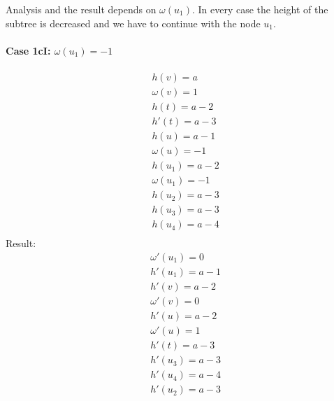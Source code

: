 Analysis and the result depends on $\omega(u_1)$. In every case the height of the subtree is decreased and we have to continue with the node $u_1$.
\paragraph*{\textbf{Case 1cI}: $\omega(u_1) = -1$}
\[
\begin{split}
& h(v) = a \\
& \omega(v) = 1 \\
& h(t) = a - 2 \\
& h'(t) = a - 3 \\
& h(u) = a - 1 \\
& \omega(u) = -1 \\
& h(u_1) = a - 2 \\
& \omega(u_1) = -1 \\
& h(u_2) = a - 3 \\
& h(u_3) = a - 3 \\
& h(u_4) = a - 4 \\
\end{split}
\]
Result:
\[
\begin{split}
& \omega'(u_1) = 0 \\
& h'(u_1) = a - 1 \\
& h'(v) = a - 2 \\
& \omega'(v) = 0 \\
& h'(u) = a - 2 \\
& \omega'(u) = 1 \\
& h'(t) = a - 3 \\
& h'(u_3) = a - 3 \\
& h'(u_4) = a - 4 \\
& h'(u_2) = a - 3 \\
\end{split}
\]

